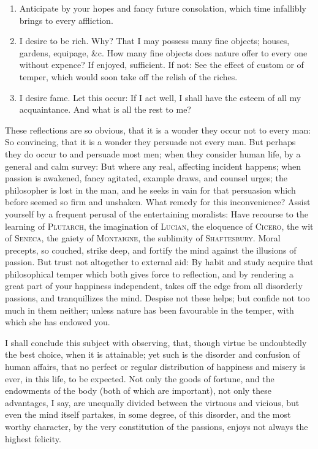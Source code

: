 {\begin{enumerate}
\item Anticipate by your hopes and fancy future consolation, which
time infallibly brings to every affliction.

\item I desire to be rich. Why? That I may possess many fine objects;
houses, gardens, equipage, \&c. How many fine objects does nature
offer to every one without expence? If enjoyed, sufficient. If not:
See the effect of custom or of temper, which would soon take off the
relish of the riches.

\item I desire fame. Let this occur: If I act well, I shall have the
esteem of all my acquaintance. And what is all the rest to me?

\end{enumerate}

These reflections are so obvious, that it is a wonder they occur not
to every man: So convincing, that it is a wonder they persuade not
every man. But perhaps they do occur to and persuade most men; when
they consider human life, by a general and calm survey: But where any
real, affecting incident happens; when passion is awakened, fancy
agitated, example draws, and counsel urges; the philosopher is lost in
the man, and he seeks in vain for that persuasion which before seemed
so firm and unshaken. What remedy for this inconvenience? Assist
yourself by a frequent perusal of the entertaining moralists: Have
recourse to the learning of \textsc{Plutarch}, the imagination of
\textsc{Lucian}, the eloquence of \textsc{Cicero}, the wit of
\textsc{Seneca}, the gaiety of \textsc{Montaigne}, the sublimity of
\textsc{Shaftesbury}. Moral precepts, so couched, strike deep, and
fortify the mind against the illusions of passion. But trust not
altogether to external aid: By habit and study acquire that
philosophical temper which both gives force to reflection, and by
rendering a great part of your happiness independent, takes off the
edge from all disorderly passions, and tranquillizes the mind. Despise
not these helps; but confide not too much in them neither; unless
nature has been favourable in the temper, with which she has endowed
you.}

I shall conclude this subject with observing, that, though virtue be
undoubtedly the best choice, when it is attainable; yet such is the
disorder and confusion of human affairs, that  no perfect or
regular distribution of happiness and misery is ever, in this life, to
be expected. Not only the goods of fortune, and the endowments of
the body (both of which are important), not only these advantages, I
say, are unequally divided between the virtuous and vicious, but even
the mind itself partakes, in some degree, of this disorder, and the
most worthy character, by the very constitution of the passions,
enjoys not always the highest felicity.

